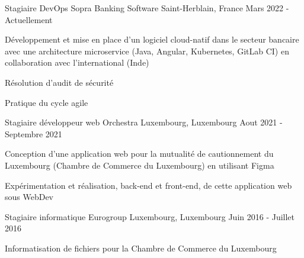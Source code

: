 
\begin{cventries}
  \cventry
    {Stagiaire DevOps} %
    {Sopra Banking Software} %
    {Saint-Herblain, France} %
    {Mars 2022 - Actuellement} %
    {
      \begin{cvitems} %
        \item {Développement et mise en place d'un logiciel cloud-natif dans le secteur bancaire avec une architecture microservice (Java, Angular, Kubernetes, GitLab CI) en collaboration avec l'international (Inde)}
        \item {Résolution d'audit de sécurité}
        \item {Pratique du cycle agile}
      \end{cvitems}
    }
    
  \cventry
    {Stagiaire développeur web} %
    {Orchestra} %
    {Luxembourg, Luxembourg} %
    {Aout 2021 - Septembre 2021} %
    {
      \begin{cvitems} %
        \item {Conception d'une application web pour la mutualité de cautionnement du Luxembourg (Chambre de Commerce du Luxembourg) en utilisant Figma}
        \item {Expérimentation et réalisation, back-end et front-end, de cette application web sous WebDev}
      \end{cvitems}
    }

  \cventry
    {Stagiaire informatique} %
    {Eurogroup} %
    {Luxembourg, Luxembourg} %
    {Juin 2016 - Juillet 2016} %
    {
      \begin{cvitems} %
        \item {Informatisation de fichiers pour la Chambre de Commerce du Luxembourg}
      \end{cvitems}
    }

\end{cventries}
